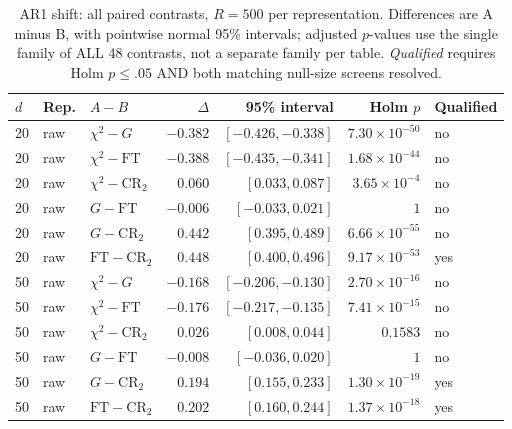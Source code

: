 \begin{table}[t]
\caption{AR1 shift: all paired contrasts, $R=500$ per representation. Differences are A minus B, with pointwise normal 95\% intervals; adjusted $p$-values use the single family of ALL 48 contrasts, not a separate family per table. \emph{Qualified} requires Holm $p\le .05$ AND both matching null-size screens resolved.}
\label{tab:matched-f-contrasts-locshift}
\centering\small
\setlength{\tabcolsep}{8pt}\renewcommand{\arraystretch}{1.2}
\begin{tabular}{lllrrrl}
\toprule
$d$ & Rep. & $A-B$ & $\Delta$ & 95\% interval & Holm $p$ & Qualified \\
\midrule
20 & raw & $\chi^2-G$ & $-0.382$ & $[-0.426, -0.338]$ & $7.30\!\times\!10^{-50}$ & no \\
20 & raw & $\chi^2-\mathrm{FT}$ & $-0.388$ & $[-0.435, -0.341]$ & $1.68\!\times\!10^{-44}$ & no \\
20 & raw & $\chi^2-\mathrm{CR}_2$ & $0.060$ & $[0.033, 0.087]$ & $3.65\!\times\!10^{-4}$ & no \\
20 & raw & $G-\mathrm{FT}$ & $-0.006$ & $[-0.033, 0.021]$ & $1$ & no \\
20 & raw & $G-\mathrm{CR}_2$ & $0.442$ & $[0.395, 0.489]$ & $6.66\!\times\!10^{-55}$ & no \\
20 & raw & $\mathrm{FT}-\mathrm{CR}_2$ & $0.448$ & $[0.400, 0.496]$ & $9.17\!\times\!10^{-53}$ & yes \\
50 & raw & $\chi^2-G$ & $-0.168$ & $[-0.206, -0.130]$ & $2.70\!\times\!10^{-16}$ & no \\
50 & raw & $\chi^2-\mathrm{FT}$ & $-0.176$ & $[-0.217, -0.135]$ & $7.41\!\times\!10^{-15}$ & no \\
50 & raw & $\chi^2-\mathrm{CR}_2$ & $0.026$ & $[0.008, 0.044]$ & $0.1583$ & no \\
50 & raw & $G-\mathrm{FT}$ & $-0.008$ & $[-0.036, 0.020]$ & $1$ & no \\
50 & raw & $G-\mathrm{CR}_2$ & $0.194$ & $[0.155, 0.233]$ & $1.30\!\times\!10^{-19}$ & yes \\
50 & raw & $\mathrm{FT}-\mathrm{CR}_2$ & $0.202$ & $[0.160, 0.244]$ & $1.37\!\times\!10^{-18}$ & yes \\
\bottomrule
\end{tabular}
\end{table}

